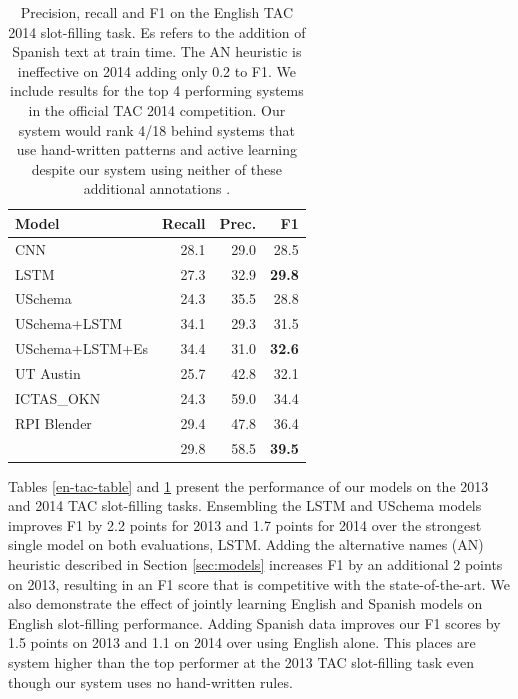 \begin{table}[t!]
\begin{center}
\begin{tabular}{|lrrr|}
\hline
\bf Model & \bf Recall & \bf Prec. & \bf F1 \\
\hline\hline
CNN                 & 28.1 & 29.0 & 28.5 \\
LSTM                & 27.3 & 32.9 & \bf 29.8  \\
USchema             & 24.3 & 35.5 & 28.8 \\
\hline\hline
USchema+LSTM        & 34.1 & 29.3 & 31.5 \\
USchema+LSTM+Es        & 34.4 & 31.0 & \bf 32.6 \\
\hline\hline
UT Austin & 25.7 & 42.8 & 32.1 \\
ICTAS\_OKN & 24.3 & 59.0 & 34.4 \\
RPI Blender & 29.4 & 47.8 & 36.4 \\
\citet{angeli2014stanford} & 29.8 & 58.5 & \bf 39.5 \\

\hline
\end{tabular}
\caption{Precision, recall and F1 on the English TAC 2014 slot-filling task. Es refers to the addition of Spanish text at train time. The AN heuristic is ineffective on 2014 adding only 0.2 to F1. We include results for the top 4 performing systems in the official TAC 2014 competition. Our system would rank 4/18 behind systems that use hand-written patterns and active learning despite our system using neither of these additional annotations \protect\citep{SurdeanuMihai2014}.\label{2014-en-tac-table}}
\end{center}
\end{table}

Tables \ref{en-tac-table} and \ref{2014-en-tac-table} present the performance of our models on the 2013 and 2014 TAC slot-filling tasks. Ensembling the LSTM and USchema models improves F1 by 2.2 points for 2013 and 1.7 points for 2014 over the strongest single model on both evaluations, LSTM. Adding the alternative names (AN) heuristic described in Section \ref{sec:models} increases F1 by an additional 2 points on 2013, resulting in an F1 score that is competitive with the state-of-the-art. We also demonstrate the effect of jointly learning English and Spanish models on English slot-filling performance. Adding Spanish data improves our F1 scores by 1.5 points on 2013 and 1.1 on 2014 over using English alone. This places are system higher than the top performer at the 2013 TAC slot-filling task even though our system uses no hand-written rules.

